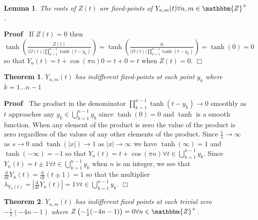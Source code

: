 \documentclass{article}
\newcommand{\mathd}{\mathrm{d}}
\newenvironment{proof}{\noindent\textbf{Proof\ }}{\hspace*{\fill}$\Box$\medskip}
\newtheorem{lemma}{Lemma}
{\theorembodyfont{\rmfamily}\newtheorem{note}{Note}}
\newtheorem{theorem}{Theorem}
\begin{document}
\begin{lemma}
  The roots of $Z (t)$ are fixed-points of $Y_{n, m} (t) \forall n, m \in
  \mathbbm{Z}^+$.
\end{lemma}

\begin{proof}
  If $Z (t) = 0$ then $\tanh \left( \frac{Z (t)}{| \Omega (t) | \prod_{k =
  1}^{n - 1} \tanh (t - y_k)} \right) = \tanh \left( \frac{0}{| \Omega (t) |
  \prod_{k = 1}^{n - 1} \tanh (t - y_k)} \right) = \tanh (0) = 0$ so that $Y_n
  (t) = t + \cos (\pi n) 0 = t + 0 = t$ when $Z (t) = 0$.
\end{proof}

\begin{theorem}
  $Y_{n, m} (t)$ has indifferent fixed-points at each point $y_k$ where $k = 1
  \ldots n - 1$
\end{theorem}

\begin{proof}
  The product in the denominator $\prod_{k = 1}^{n - 1} \tanh (t - y_k)
  \rightarrow 0$ smoothly as $t$ approaches any $y_k \in \bigcup_{k = 1}^{n -
  1} y_k$ since $\tanh (0) = 0$ and $\tanh$ is a smooth function. When any
  element of the product is zero the value of the product is zero regardless
  of the values of any other elements of the product. Since $\frac{1}{s}
  \rightarrow \infty$ as $s \rightarrow 0$ and $\tanh (| x |) \rightarrow 1$
  as $| x | \rightarrow \infty$ we have $\tanh (\infty) = 1$ and $\tanh (-
  \infty) = - 1$ so that $Y_n (t) = t + \cos (\pi n) \forall t \in \bigcup_{k
  = 1}^{n - 1} y_k$. Since $Y_n (t) = t \pm 1 \forall t \in \bigcup_{k = 1}^{n
  - 1} y_k$ when $n$ is an integer, we see that $\frac{\mathd}{\mathd t} Y_n
  (t) = \frac{\mathd}{\mathd t} (t \pm 1) = 1$ so that the multiplier
  $\lambda_{Y_n (t)} = \left| \frac{\mathd}{\mathd t} Y_n (t) \right| = 1
  \forall t \in \bigcup_{k = 1}^{n - 1} y_k$.
\end{proof}

\begin{theorem}
  $Y_{n, m} (t)$ has indifferent fixed points at each trivial zero $-
  \frac{i}{2} (- 4 n - 1)$ where $Z \left( - \frac{i}{2} (- 4 n - 1) \right) =
  0 \forall n \in \mathbbm{Z}^{+_{}}$.
\end{theorem}
\end{document}
